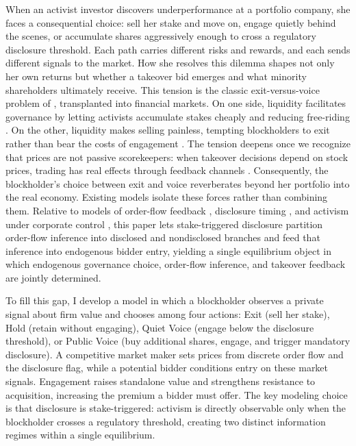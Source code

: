 \documentclass[11pt]{article}
\newcommand{\1}{\mathbf{1}}
\begin{document}
When an activist investor discovers underperformance at a portfolio company, she faces a consequential choice: sell her stake and move on, engage quietly behind the scenes, or accumulate shares aggressively enough to cross a regulatory disclosure threshold. Each path carries different risks and rewards, and each sends different signals to the market. How she resolves this dilemma shapes not only her own returns but whether a takeover bid emerges and what minority shareholders ultimately receive. This tension is the classic exit-versus-voice problem of \citet{Hirschman1970}, transplanted into financial markets. On one side, liquidity facilitates governance by letting activists accumulate stakes cheaply and reducing free-riding \citep{Maug1998}. On the other, liquidity makes selling painless, tempting blockholders to exit rather than bear the costs of engagement \citep{Coffee1991,Bhide1993}. The tension deepens once we recognize that prices are not passive scorekeepers: when takeover decisions depend on stock prices, trading has real effects through feedback channels \citep{BondEdmansGoldstein2012,EdmansGoldsteinJiang2012}. Consequently, the blockholder's choice between exit and voice reverberates beyond her portfolio into the real economy. Existing models isolate these forces rather than combining them. Relative to models of order-flow feedback \citep{EdmansGoldsteinJiang2015}, disclosure timing \citep{OrdonezCalafiBernhardt2022}, and activism under corporate control \citep{CorumLevit2019,CetemenCisternasKolbViswanathan2026}, this paper lets stake-triggered disclosure partition order-flow inference into disclosed and nondisclosed branches and feed that inference into endogenous bidder entry, yielding a single equilibrium object in which endogenous governance choice, order-flow inference, and takeover feedback are jointly determined.

To fill this gap, I develop a model in which a blockholder observes a private signal about firm value and chooses among four actions: Exit (sell her stake), Hold (retain without engaging), Quiet Voice (engage below the disclosure threshold), or Public Voice (buy additional shares, engage, and trigger mandatory disclosure). A competitive market maker sets prices from discrete order flow and the disclosure flag, while a potential bidder conditions entry on these market signals. Engagement raises standalone value and strengthens resistance to acquisition, increasing the premium a bidder must offer. The key modeling choice is that disclosure is stake-triggered: activism is directly observable only when the blockholder crosses a regulatory threshold, creating two distinct information regimes within a single equilibrium.
\end{document}
